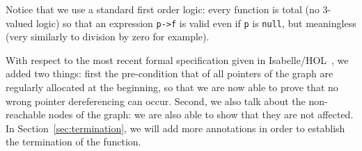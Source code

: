 Notice that we use a standard first order logic: every function is
total (no 3-valued logic) so that an expression \verb|p->f| is valid
even if \verb|p| is \verb|null|, but meaningless (very similarly to
division by zero for example).

With respect to the most recent formal specification given in
Isabelle/HOL~\cite{mehta03cade}, we added two things: first the
pre-condition that of all pointers of the graph are regularly
allocated at the beginning, so that we are now able to prove that no
wrong pointer dereferencing can occur. Second, we also talk about the
non-reachable nodes of the graph: we are also able to show that they
are not affected. In Section~\ref{sec:termination}, we will add
more annotations in order to establish the termination of the
function.


